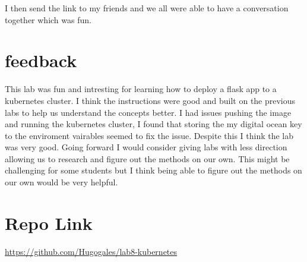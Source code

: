 \documentclass[12pt]{Article}
\begin{document}
I then send the link to my friends and we all were able to have a conversation together which was fun.

\section*{feedback}
This lab was fun and intresting for learning how to deploy a flask app to a kubernetes cluster.
I think the instructions were good and built on the previous labs to help us understand the concepts better.
I had issues pushing the image and running the kubernetes cluster, I found that storing the my digital ocean key to the enviroment vairables seemed to fix the issue.
Despite this I think the lab was very good.
Going forward I would consider giving labs with less direction allowing us to research and figure out the methods on our own.
This might be challenging for some students but I think being able to figure out the methods on our own would be very helpful.  


\section*{Repo Link}
\href{https://github.com/Hugogales/lab8-kubernetes}{https://github.com/Hugogales/lab8-kubernetes}
\end{document}
